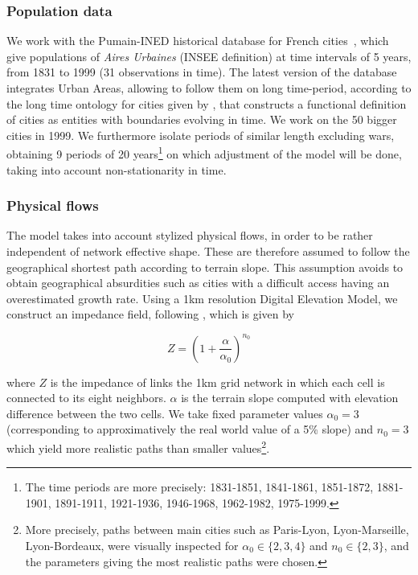\documentclass{article}
\begin{document}
\subsubsection*{Population data}

We work with the Pumain-INED historical database for French cities~\citep{pumain1986fichier}, which give populations of \emph{Aires Urbaines} (INSEE definition) at time intervals of 5 years, from 1831 to 1999 (31 observations in time). The latest version of the database integrates Urban Areas, allowing to follow them on long time-period, according to the long time ontology for cities given by \cite{bretagnolle:tel-00459720}, that constructs a functional definition of cities as entities with boundaries evolving in time. We work on the 50 bigger cities in 1999. We furthermore isolate periods of similar length excluding wars, obtaining 9 periods of 20 years\footnote{The time periods are more precisely: 1831-1851, 1841-1861, 1851-1872, 1881-1901, 1891-1911, 1921-1936, 1946-1968, 1962-1982, 1975-1999.} on which adjustment of the model will be done, taking into account non-stationarity in time.


\subsubsection*{Physical flows}


The model takes into account stylized physical flows, in order to be rather independent of network effective shape. These are therefore assumed to follow the geographical shortest path according to terrain slope. This assumption avoids to obtain geographical absurdities such as cities with a difficult access having an overestimated growth rate. Using a 1km resolution Digital Elevation Model, we construct an impedance field, following \cite{collischonn2000direction}, which is given by

\[
Z = \left(1 + \frac{\alpha}{\alpha_0}\right)^{n_0}
\]

where $Z$ is the impedance of links the 1km grid network in which each cell is connected to its eight neighbors. $\alpha$ is the terrain slope computed with elevation difference between the two cells. We take fixed parameter values $\alpha_0 = 3$ (corresponding to approximatively the real world value of a 5\% slope) and $n_0 = 3$ which yield more realistic paths than smaller values\footnote{More precisely, paths between main cities such as Paris-Lyon, Lyon-Marseille, Lyon-Bordeaux, were visually inspected for $\alpha_0 \in \{2,3,4\}$ and $n_0 \in \{2,3\}$, and the parameters giving the most realistic paths were chosen.}.
\end{document}

